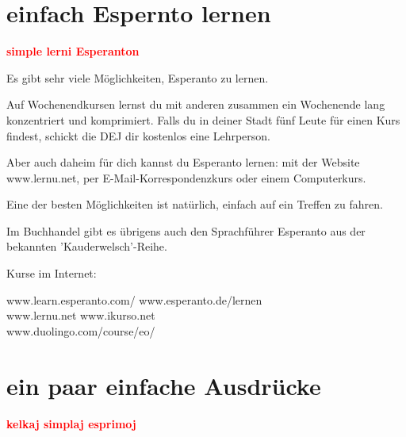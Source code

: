 \documentclass{leaflet}
\begin{document}
\section{einfach Espernto lernen}

\vspace{-.3cm}

\begin{flushright}
\textbf{\large \textcolor{red}{simple lerni Esperanton}}
\end{flushright}

\vspace{-.3cm}

{\centering
	Es gibt sehr viele Möglichkeiten, Esperanto zu lernen.
} 

Auf Wochenendkursen lernst du mit anderen zusammen ein Wochenende lang konzentriert und komprimiert. Falls du in deiner Stadt fünf Leute für einen Kurs findest, schickt die DEJ dir kostenlos eine Lehrperson. 

Aber auch daheim für dich kannst du Esperanto lernen: mit der Website www.lernu.net, per E-Mail-Korrespondenzkurs oder einem Computerkurs. 

Eine der besten Möglichkeiten ist natürlich, einfach auf ein Treffen zu fahren. 

Im Buchhandel gibt es übrigens auch den Sprachführer Esperanto aus der bekannten 'Kauderwelsch'-Reihe.

Kurse im Internet:

{
	\begin{addmargin}[.5em]{.3em}
	www.learn.esperanto.com/ \hfill www.esperanto.de/lernen \\
	www.lernu.net \hfill www.ikurso.net \\
	www.duolingo.com/course/eo/ 
	\end{addmargin}
}

\vspace{-.4cm}

\section{ein paar einfache Ausdrücke}

\vspace{-.3cm}

\begin{flushright}
\textbf{\large{\textcolor{red}{kelkaj simplaj esprimoj}}}
\end{flushright}

\vspace{-.3cm}
\end{document}
